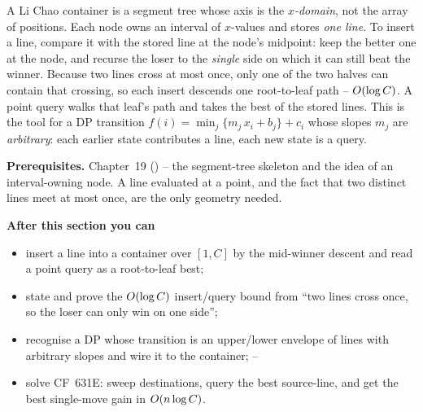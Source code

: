 \begin{topicintro}
A Li Chao container is a segment tree whose axis is the \emph{\(x\)-domain}, not
the array of positions.  Each node owns an interval of \(x\)-values and stores
\emph{one line}.  To insert a line, compare it with the stored line at the
node's midpoint: keep the better one at the node, and recurse the loser to the
\emph{single} side on which it can still beat the winner.  Because two lines
cross at most once, only one of the two halves can contain that crossing, so
each insert descends one root-to-leaf path -- \(O(\log C)\).  A point query
walks that leaf's path and takes the best of the stored lines.  This is the tool
for a DP transition \(f(i)=\min_{j}\{m_j\,x_i+b_j\}+c_i\) whose slopes \(m_j\)
are \emph{arbitrary}: each earlier state contributes a line, each new state is a
query.

\textbf{Prerequisites.} Chapter~19 () -- the segment-tree skeleton and
the idea of an interval-owning node.  A line evaluated at a point, and the fact
that two distinct lines meet at most once, are the only geometry needed.

\textbf{After this section you can}
\begin{itemize}[nosep]
  \item insert a line into a container over \([1,C]\) by the mid-winner descent
        and read a point query as a root-to-leaf best; \hfill{}
  \item state and prove the \(O(\log C)\) insert/query bound from ``two lines
        cross once, so the loser can only win on one side''; \hfill{}
  \item recognise a DP whose transition is an upper/lower envelope of lines with
        arbitrary slopes and wire it to the container; \hfill{}--
  \item solve CF~631E: sweep destinations, query the best source-line, and get
        the best single-move gain in \(O(n\log C)\). \hfill{}
\end{itemize}
\end{topicintro}

